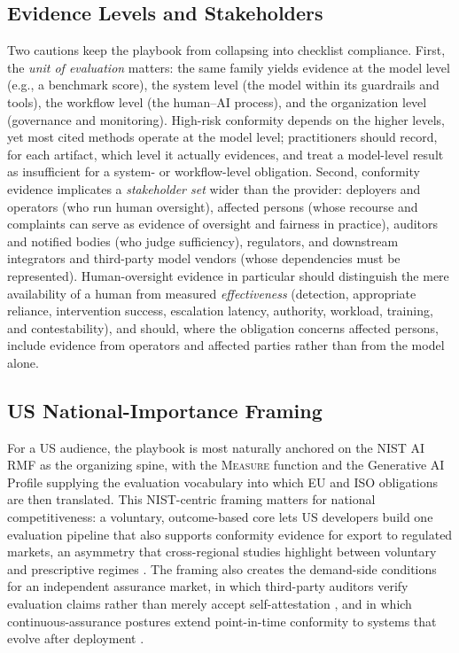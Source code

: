 \subsection{Evidence Levels and Stakeholders}
Two cautions keep the playbook from collapsing into checklist compliance. First, the \emph{unit of evaluation} matters: the same family yields evidence at the model level (e.g., a benchmark score), the system level (the model within its guardrails and tools), the workflow level (the human--AI process), and the organization level (governance and monitoring). High-risk conformity depends on the higher levels, yet most cited methods operate at the model level; practitioners should record, for each artifact, which level it actually evidences, and treat a model-level result as insufficient for a system- or workflow-level obligation. Second, conformity evidence implicates a \emph{stakeholder set} wider than the provider: deployers and operators (who run human oversight), affected persons (whose recourse and complaints can serve as evidence of oversight and fairness in practice), auditors and notified bodies (who judge sufficiency), regulators, and downstream integrators and third-party model vendors (whose dependencies must be represented). Human-oversight evidence in particular should distinguish the mere availability of a human from measured \emph{effectiveness} (detection, appropriate reliance, intervention success, escalation latency, authority, workload, training, and contestability), and should, where the obligation concerns affected persons, include evidence from operators and affected parties rather than from the model alone.

\subsection{US National-Importance Framing}
For a US audience, the playbook is most naturally anchored on the NIST AI RMF as the organizing spine, with the \textsc{Measure} function and the Generative AI Profile \cite{nist2024genai} supplying the evaluation vocabulary into which EU and ISO obligations are then translated. This NIST-centric framing matters for national competitiveness: a voluntary, outcome-based core lets US developers build one evaluation pipeline that also supports conformity evidence for export to regulated markets, an asymmetry that cross-regional studies highlight between voluntary and prescriptive regimes \cite{almaamari2025crossregional}. The framing also creates the demand-side conditions for an independent assurance market, in which third-party auditors verify evaluation claims rather than merely accept self-attestation \cite{auditing2024frontier}, and in which continuous-assurance postures extend point-in-time conformity to systems that evolve after deployment \cite{lupo2026trustworthyposture}.


